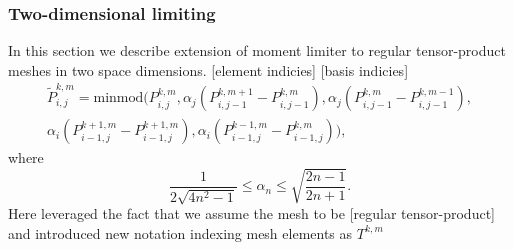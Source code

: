 \subsubsection{Two-dimensional limiting}
In this section we describe extension of moment limiter to regular tensor-product meshes 
in two space dimensions.
[\todo element indicies]
[\todo basis indicies]
\begin{multline}
\tilde{P}^{k,m}_{i,j} =
	\text{minmod}\big(P^{k,m}_{i,j}, 
					  \alpha_j(P^{k,m+1}_{i,j-1} - P^{k,m}_{i,j-1}),
					  \alpha_j(P^{k,m}_{i,j-1} - P^{k,m-1}_{i,j-1}),\\
					  \alpha_i(P^{k+1,m}_{i-1,j} - P^{k+1,m}_{i-1,j}),
					  \alpha_i(P^{k-1,m}_{i-1,j} - P^{k,m}_{i-1,j})\big),
\end{multline}
where 
\begin{equation}
	\frac{1}{2\sqrt{4n^2 - 1}} \leq \alpha_n \leq \sqrt{\frac{2n - 1}{2n + 1}}.
\end{equation}
Here leveraged the fact that we assume the mesh to be [regular tensor-product] and 
introduced new notation indexing mesh elements as $T^{k,m}$




